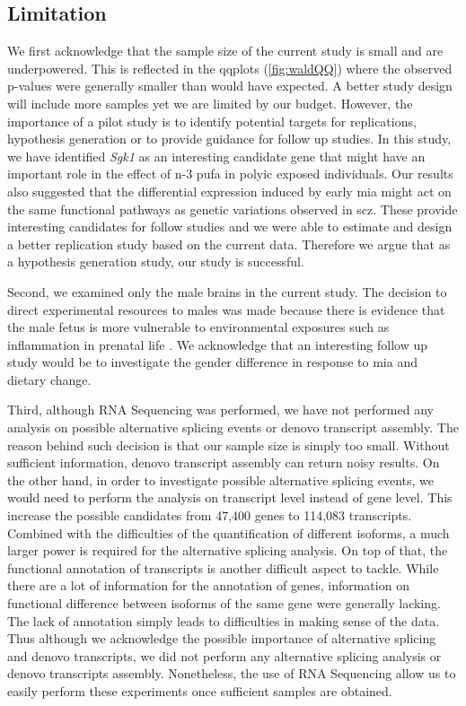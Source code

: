 \documentclass[12pt]{scrbook}
\begin{document}
\subsection{Limitation}
We first acknowledge that the sample size of the current study is small and are underpowered.
This is reflected in the \glspl{qqplot} (\cref{fig:waldQQ}) where the observed p-values were generally smaller than would have expected.
A better study design will include more samples yet we are limited by our budget.
However, the importance of a pilot study is to identify potential targets for replications, hypothesis generation or to provide guidance for follow up studies. 
In this study, we have identified \textit{Sgk1} as an interesting candidate gene that might have an important role in the effect of n-3 \gls{pufa} in \gls{polyic} exposed individuals.
Our results also suggested that the differential expression induced by early \gls{mia} might act on the same functional pathways as genetic variations observed in \gls{scz}.
These provide interesting candidates for follow studies and we were able to estimate and design a better replication study based on the current data. 
Therefore we argue that as a hypothesis generation study, our study is successful.

Second, we examined only the male brains in the current study. 
The decision to direct experimental resources to males was made because there is evidence that the male fetus is more vulnerable to environmental exposures such as inflammation in prenatal life \citep{Bergeron2013,Lein2007}. 
We acknowledge that an interesting follow up study would be to investigate the gender difference in response to \gls{mia} and dietary change.

Third, although RNA Sequencing was performed, we have not performed any analysis on possible alternative splicing events or denovo transcript assembly.
The reason behind such decision is that our sample size is simply too small.
Without sufficient information, denovo transcript assembly can return noisy results.
On the other hand, in order to investigate possible alternative splicing events, we would need to perform the analysis on transcript level instead of gene level. 
This increase the possible candidates from 47,400 genes to 114,083 transcripts.
Combined with the difficulties of the quantification of different isoforms, a much larger power is required for the alternative splicing analysis. 
On top of that, the functional annotation of transcripts is another difficult aspect to tackle.
While there are a lot of information for the annotation of genes, information on functional difference between isoforms of the same gene were generally lacking. 
The lack of annotation simply leads to difficulties in making sense of the data. 
Thus although we acknowledge the possible importance of alternative splicing and denovo transcripts, we did not perform any alternative splicing analysis or denovo transcripts assembly.
Nonetheless, the use of RNA Sequencing allow us to easily perform these experiments once sufficient samples are obtained.
\end{document}
